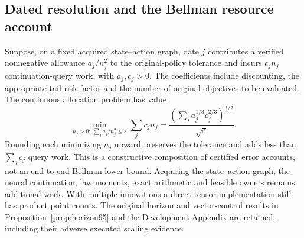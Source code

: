 \subsection{Dated resolution and the Bellman resource account}
Suppose, on a fixed acquired state--action graph, date $j$ contributes a verified nonnegative allowance $a_j/n_j^2$ to the original-policy tolerance and incurs $c_j n_j$ continuation-query work, with $a_j,c_j>0$. The coefficients include discounting, the appropriate tail-risk factor and the number of original objectives to be evaluated. The continuous allocation problem has value
\begin{equation}\label{eq:allocation99}
 \min_{n_j>0:\,\sum_j a_j/n_j^2\le\varepsilon}
       \sum_j c_jn_j
 =\frac{\left(\sum_j a_j^{1/3}c_j^{2/3}\right)^{3/2}}{\sqrt\varepsilon}.
\end{equation}
Rounding each minimizing $n_j$ upward preserves the tolerance and adds less than $\sum_jc_j$ query work. This is a constructive composition of certified error accounts, not an end-to-end Bellman lower bound. Acquiring the state--action graph, the neural continuation, law moments, exact arithmetic and feasible owners remains additional work. With multiple innovations a direct tensor implementation still has product point counts. The original horizon and vector-control results in Proposition~\ref{prop:horizon95} and the Development Appendix are retained, including their adverse executed scaling evidence.
